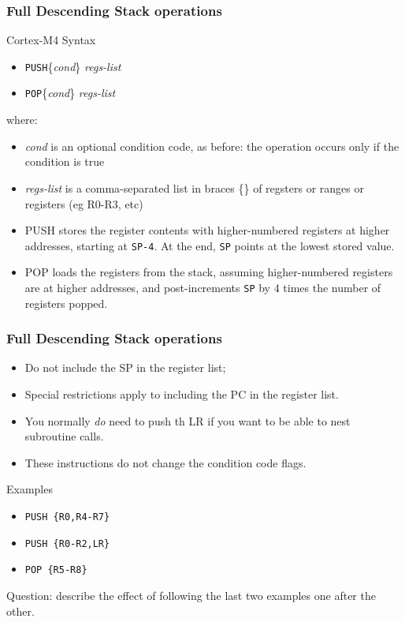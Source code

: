 \documentclass[10pt]{beamer}
\begin{document}
\begin{frame}
\frametitle{Full Descending Stack operations}
Cortex-M4 Syntax
\begin{itemize}
\item \texttt{PUSH}\{\textit{cond}\} \textit{regs-list}
\item \texttt{POP}\{\textit{cond}\} \textit{regs-list}
\end{itemize}

where:
\begin{itemize}
\item \textit{cond} is an optional condition code, as before: the operation occurs only if the condition is true
\item \textit{regs-list} is a comma-separated list in braces \{\} of regsters or ranges or registers (eg R0-R3, etc)
\item PUSH stores the register contents with higher-numbered registers at higher addresses, starting at \texttt{SP-4}. At the end, \texttt{SP} points at the lowest stored value.
\item POP loads the registers from the stack, assuming higher-numbered registers are at higher addresses, and post-increments \texttt{SP} by 4 times the number of registers popped.
\end{itemize}
\end{frame}

\begin{frame}
\frametitle{Full Descending Stack operations}
\begin{itemize}
\item Do not include the SP in the register list;
\item Special restrictions apply to including the PC in the register list.
\item You normally \emph{do} need to push th LR if you want to be able to nest subroutine calls.
\item These instructions do not change the condition code flags.
\end{itemize}

Examples
\begin{itemize}
\item \texttt{PUSH \{R0,R4-R7\}}
\item \texttt{PUSH \{R0-R2,LR\}}
\item \texttt{POP \{R5-R8\}}
\end{itemize}

Question: describe the effect of following the last two examples one after the other.
\end{frame}
\end{document}
